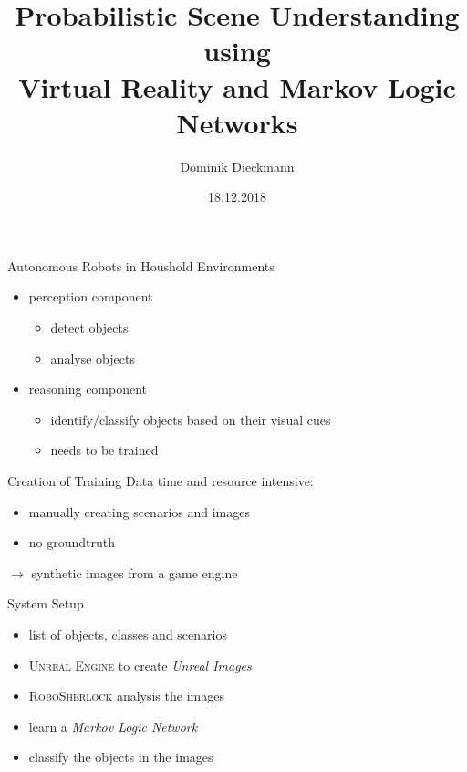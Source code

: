 \documentclass[]{beamer}
\title[Short version]{Probabilistic Scene Understanding using\\ Virtual Reality and Markov Logic Networks}
\subtitle[]{}
\date[]{18.12.2018}
\author[D. Dieckmann]{Dominik Dieckmann}
\institute[Uni Bremen]{Institute for Artificial Intelligence \\ University Bremen}
\begin{document}
\beamertemplatenavigationsymbolsempty

\begin{frame}
	\maketitle
\end{frame}

\begin{frame}{Autonomous Robots in Houshold Environments}
	\begin{itemize}
		\item perception component
			\begin{itemize}
				\item detect objects
				\item analyse objects
			\end{itemize}
		\item reasoning component
			\begin{itemize}
				\item identify/classify objects based on their visual cues
				\item needs to be trained
			\end{itemize}
	\end{itemize}
\end{frame}

\begin{frame}{Creation of Training Data}
time and resource intensive:
	\begin{itemize}
		\item manually creating scenarios and images
		\item no groundtruth
	\end{itemize}
	
$\rightarrow$ synthetic images from a game engine
\end{frame}

\begin{frame}{System Setup}
	\begin{itemize}
		\item list of objects, classes and scenarios
		\item \textsc{Unreal Engine} to create \textit{Unreal Images}
		\item \textsc{RoboSherlock} analysis the images
		\item learn a \textit{Markov Logic Network} 
		\item classify the objects in the images
	\end{itemize}
\end{frame}
\end{document}
